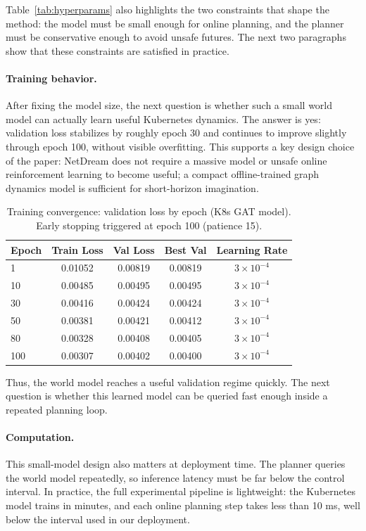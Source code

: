 Table~\ref{tab:hyperparams} also highlights the two constraints that
shape the method: the model must be small enough for online planning, and
the planner must be conservative enough to avoid unsafe futures.  The
next two paragraphs show that these constraints are satisfied in
practice.

\paragraph{Training behavior.}
After fixing the model size, the next question is whether such a small
world model can actually learn useful Kubernetes dynamics.  The answer is
yes: validation loss stabilizes by roughly epoch 30 and continues to
improve slightly through epoch 100, without visible overfitting.  This
supports a key design choice of the paper: NetDream does not require a
massive model or unsafe online reinforcement learning to become useful;
a compact offline-trained graph dynamics model is sufficient for
short-horizon imagination.

\begin{table}[H]
\centering
\small
\caption{Training convergence: validation loss by epoch (K8s GAT model).
Early stopping triggered at epoch 100 (patience 15).}
\label{tab:training}
\begin{tabular}{@{}lcccc@{}}
\toprule
Epoch & Train Loss & Val Loss & Best Val & Learning Rate \\
\midrule
1 & 0.01052 & 0.00819 & 0.00819 & $3\!\times\!10^{-4}$ \\
10 & 0.00485 & 0.00495 & 0.00495 & $3\!\times\!10^{-4}$ \\
30 & 0.00416 & 0.00424 & 0.00424 & $3\!\times\!10^{-4}$ \\
50 & 0.00381 & 0.00421 & 0.00412 & $3\!\times\!10^{-4}$ \\
80 & 0.00328 & 0.00408 & 0.00405 & $3\!\times\!10^{-4}$ \\
100 & 0.00307 & 0.00402 & 0.00400 & $3\!\times\!10^{-4}$ \\
\bottomrule
\end{tabular}
\end{table}

Thus, the world model reaches a useful validation regime quickly.  The
next question is whether this learned model can be queried fast enough
inside a repeated planning loop.

\paragraph{Computation.}
This small-model design also matters at deployment time.  The planner
queries the world model repeatedly, so inference latency must be far
below the control interval.  In practice, the full experimental pipeline
is lightweight: the Kubernetes model trains in minutes, and each online
planning step takes less than 10 ms, well below the interval used in our
deployment.

